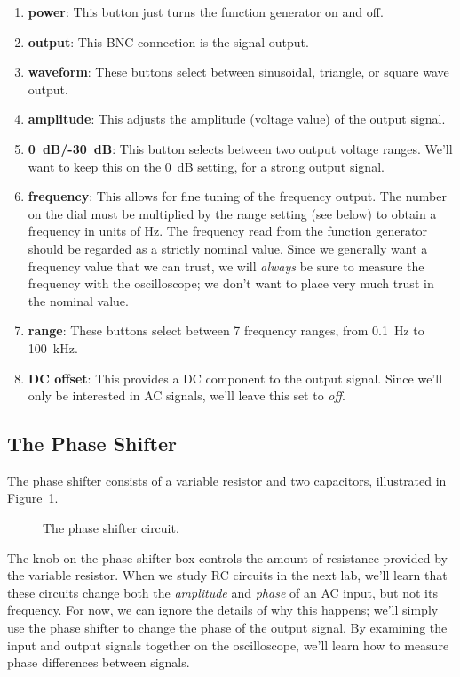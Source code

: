 \begin{enumerate}

\item {\bf power}: This button just turns the function generator on and off.

\item {\bf output}: This BNC connection is the signal output.

\item {\bf waveform}: These buttons select between sinusoidal, triangle, or 
square wave output.

\item {\bf amplitude}: This adjusts the amplitude (voltage value) of the output
signal.

\item {\bf 0~dB/-30~dB}: This button selects between two output voltage ranges.
We'll want to keep this on the 0~dB setting, for a strong output signal.  

\item {\bf frequency}: This allows for fine tuning of the frequency output.
The number on the dial must be multiplied by the range setting (see below) to 
obtain a frequency in units of Hz. The frequency read from the function 
generator should be regarded as a strictly nominal value. Since we generally 
want a frequency value that we can trust, we will {\it always} be sure to 
measure the frequency with the oscilloscope; we don't want to place very much 
trust in the nominal value.

\item {\bf range}: These buttons select between 7 frequency ranges, from 
0.1~Hz to 100~kHz.

\item {\bf DC offset}: This provides a DC component to the output signal. Since
we'll only be interested in AC signals, we'll leave this set to {\it off}.

\end{enumerate}

\subsection{The Phase Shifter}

The phase shifter consists of a variable resistor and two capacitors, 
illustrated in Figure~\ref{fig:scope:phaseshifter}.
\begin{figure}[htb]
\centerline{\epsfxsize=8cm }
\caption{The phase shifter circuit.}
\label{fig:scope:phaseshifter}
\end{figure}
The knob on the phase shifter box controls the amount of resistance provided
by the variable resistor.  When we study RC circuits in the next lab, we'll
learn that these circuits change both the {\it amplitude} and {\it phase} of
an AC input, but not its frequency.  For now, we can ignore the details of
why this happens; we'll simply use the phase shifter to change the phase of the
output signal.  By examining the input and output signals together on the 
oscilloscope, we'll learn how to measure phase differences between signals.

